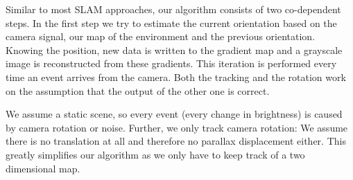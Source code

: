 Similar to most SLAM approaches, our algorithm consists of two co-dependent
steps. In the first step we try to estimate the current orientation based on
the camera signal, our map of the environment and the previous orientation.
Knowing the position, new data is written to the gradient map and a grayscale
image is reconstructed from these gradients. This iteration is performed every
time an event arrives from the camera. Both the tracking and the rotation work
on the assumption that the output of the other one is correct.

We assume a static scene, so every event (every change in brightness) is caused
by camera rotation or noise.
Further, we only track camera rotation: We assume there is no translation at
all and therefore no parallax displacement either. This greatly simplifies our
algorithm as we only have to keep track of a two dimensional map.
